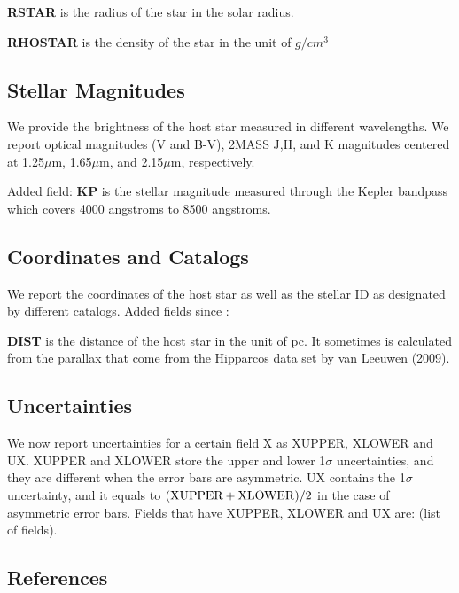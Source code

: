 \documentclass[11pt,preprint]{aastex}
\def\micron{$\mu$m}
\def\micron{$\mu$m}
\begin{document}
\begin{CJK*}{UTF8}{gbsn}
{\bf RSTAR} is the radius of the star in the solar radius. 

{\bf RHOSTAR} is the density of the star in the unit of $g/cm^3$

\subsection {Stellar Magnitudes}

We provide the brightness of the host star measured in different wavelengths. We report optical magnitudes (V and B-V), 2MASS J,H, and K magnitudes centered at 1.25\micron, 1.65\micron, and 2.15\micron, respectively. 

Added field: 
{\bf KP} is the stellar magnitude measured through the Kepler bandpass which covers 4000 angstroms to 8500 angstroms. 

\subsection{Coordinates and Catalogs}
We report the coordinates of the host star as well as the stellar ID as designated by different catalogs. 
Added fields since \cite{Wright2011}:

{\bf DIST} is the distance of the host star in the unit of pc. It sometimes is calculated from the parallax that come from the Hipparcos data set by van Leeuwen (2009).


\subsection{Uncertainties}

We now report uncertainties for a certain field X as XUPPER, XLOWER
and UX. XUPPER and XLOWER store the upper and lower 1$\sigma$
uncertainties, and they are different when the error bars are
asymmetric. UX contains the 1$\sigma$ uncertainty, and it
equals to $({\rm XUPPER+XLOWER})/2$ in the case of asymmetric error
bars. Fields that have XUPPER, XLOWER and UX are: (list of fields).

\subsection{References}


\end{CJK*}
\end{document}
